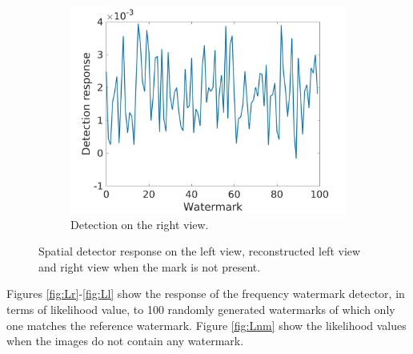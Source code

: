 \begin{figure}[h!]
\begin{subfigure}[t]{0.5\textwidth}
\includegraphics[width=1\textwidth]{./img/corr_gauss/right_warped_corr_value_NM.jpg}
   \caption{\small{Detection on the right view.}\label{fig:gr}}
\end{subfigure}
\caption{Spatial detector response on the left view, reconstructed left view and right view when the mark is not present.\label{fig:gauss}}
\end{figure}

\clearpage
Figures \ref{fig:Lr}-\ref{fig:Ll} show the response of the frequency watermark detector, in terms of likelihood value, to 100 randomly generated watermarks of which only one matches the reference watermark. Figure \ref{fig:Lnm} show the likelihood values when the images do not contain any watermark.

